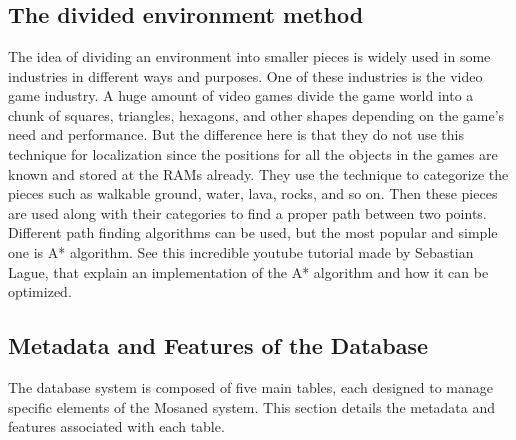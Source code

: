 \appendix %

\chapter{}
\section{The divided environment method}

The idea of dividing an environment into smaller pieces is widely used in
some industries in different ways and purposes. One of these industries is the video game industry. A huge amount of video games divide the game world
into a chunk of squares, triangles, hexagons, and other shapes depending on the
game’s need and performance. But the difference here is that they do not use
this technique for localization since the positions for all the objects in the games
are known and stored at the RAMs already. They use the technique to categorize
the pieces such as walkable ground, water, lava, rocks, and so on. Then these
pieces are used along with their categories to find a proper path between two
points. Different path finding algorithms can be used, but the most popular and
simple one is A* algorithm. See this \cite{SebastianLague_AStar} incredible youtube tutorial made by
Sebastian Lague, that explain an implementation of the A* algorithm and how
it can be optimized.

\section{Metadata and Features of the Database}
\label{appendix:db_metadata}

The database system is composed of five main tables, each designed to manage specific elements of the Mosaned system. This section details the metadata and features associated with each table.

